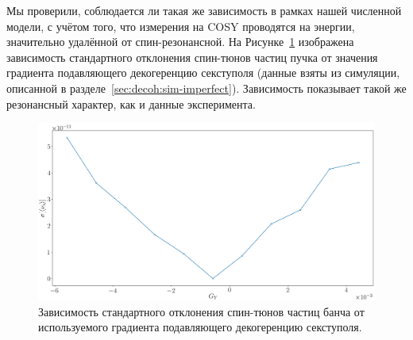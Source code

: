 Мы проверили, соблюдается ли такая же зависимость в рамках нашей численной модели, с учётом того, что измерения на COSY проводятся на энергии, значительно удалённой от спин-резонансной. На Рисунке~\ref{fig:SCT_resonance} изображена зависимость стандартного отклонения спин-тюнов частиц пучка от значения градиента подавляющего декогеренцию секступоля (данные взяты из симуляции, описанной в разделе~\ref{sec:decoh:sim-imperfect}). Зависимость показывает такой же резонансный характер, как и данные эксперимента.

\begin{figure}[h]
	\centering
	\includegraphics[width=\linewidth]{images/decoh_sim/stune_sd_vs_sext_strength_resonance}
	\caption{Зависимость стандартного отклонения спин-тюнов частиц банча от используемого градиента подавляющего декогеренцию секступоля.\label{fig:SCT_resonance}}
\end{figure}
